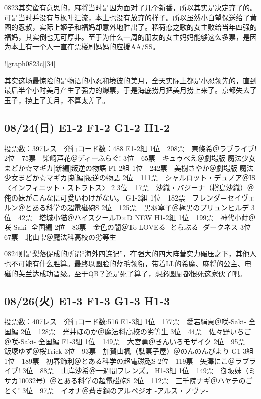 0823其实蛮有意思的，麻将当时是因为面对了几个新番，所以其实是决定弃了的。可是当时并没有与枫叶汇流，本土也没有放弃的样子。所以虽然小白望保送给了黄图的忍叔，实际上姬子和福妈却意外地胜出了。稻荷恋之歌的女主败给当年四强的福妈，其实倒也无可厚非。至于为什么一周的朋友的女主妈妈能够这么多票，是因为本土有一个人一直在票楼刷妈妈的应援AA/SS。

![graph0823c][34]

其实这场最惊险的是物语的小忍和境彼的美月，全天实际上都是小忍领先的，直到最后半个小时美月产生了强力的爆票，于是海底捞月把美月捞上来了。京都失去了玉子，捞上了美月，不算太差了。

\subsection{08/24(日) E1-2 F1-2 G1-2 H1-2}

	投票数：397レス　発行コード数：488
	E1-2組
	1位　208票　東條希＠ラブライブ!
	2位　75票　柴崎芦花＠ディーふらぐ!
	3位　65票　キュゥべえ＠劇場版 魔法少女まどか☆マギカ[新編]叛逆の物語
	F1-2組
	1位　242票　美樹さやか＠劇場版 魔法少女まどか☆マギカ[新編]叛逆の物語
	2位　111票　シャルロット・デュノア＠IS〈インフィニット・ストラトス〉 2
	3位　17票　沙織・バジーナ（槇島沙織）＠俺の妹がこんなに可愛いわけがない。
	G1-2組
	1位　182票　フレンダ＝セイヴェルン＠とある科学の超電磁砲S
	2位　125票　黒羽寧子＠極黒のブリュンヒルデ
	3位　42票　塔城小猫＠ハイスクールD×D NEW
	H1-2組
	1位　199票　神代小蒔＠咲-Saki- 全国編
	2位　83票　金色の闇＠To LOVEる -とらぶる- ダークネス
	3位　67票　北山雫＠魔法科高校の劣等生

0824则是梨落促成的所谓“海外四连记”，在强大的四大阵营实力碾压之下，其他人也不可能有什么胜算。最终以圆脸的蓝毛领衔，带着LL的希魔、麻将的公主、电磁的芙兰达成功晋级。至于QB？还是死了算了，想必圆厨都恨死这家伙了吧。

\subsection{08/26(火) E1-3 F1-3 G1-3 H1-3}

	投票数：407レス　発行コード数:516
	E1-3組
	1位　177票　愛宕絹恵＠咲-Saki- 全国編
	2位　128票　光井ほのか＠魔法科高校の劣等生
	3位　44票　佐々野いちご＠咲-Saki- 全国編
	F1-3組
	1位　149票　大宮勇＠きんいろモザイク
	2位　95票　飯塚ゆず＠桜Trick
	3位　93票　加賀山楓（駄菓子屋）＠のんのんびより
	G1-3組
	1位　189票　初春飾利＠とある科学の超電磁砲S
	2位　119票　矢澤にこ＠ラブライブ!
	3位　88票　山岸沙希＠一週間フレンズ。
	H1-3組
	1位　149票　御坂妹（ミサカ10032号）＠とある科学の超電磁砲S
	2位　112票　三千院ナギ＠ハヤテのごとく!
	3位　97票　イオナ＠蒼き鋼のアルペジオ -アルス・ノヴァ-

